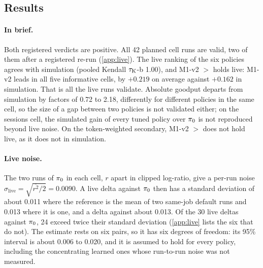 \subsection{Results}
\label{sec:live-results}

\paragraph{In brief.}
Both registered verdicts are positive. All 42 planned cell runs are valid, two of them after a
registered re-run (\cref{app:live}). The live ranking of the six policies agrees with simulation
(pooled Kendall $\tau_{\mathrm{K}}$-b 1.00), and M1-v2 $>$  holds live: M1-v2 leads in all five
informative cells, by $+0.219$ on average against $+0.162$ in simulation. That is all the live runs
validate. Absolute goodput departs from simulation by factors of 0.72 to 2.18, differently for
different policies in the same cell, so the size of a gap between two policies is not validated
either; on the sessions cell, the simulated gain of every tuned policy over $\pi_{0}$ is not
reproduced beyond live noise. On the token-weighted secondary, M1-v2 $>$  does not
hold live, as it does not in simulation.

\paragraph{Live noise.}
The two runs of $\pi_{0}$ in each cell, $r$ apart in clipped log-ratio, give a per-run noise
$\sigma_{\mathrm{live}} = \sqrt{\overline{r^2}/2} = 0.0090$. A live delta against $\pi_{0}$ then has a
standard deviation of about 0.011 where the reference is the mean of two same-job default runs and
0.013 where it is one, and a delta against  about 0.013. Of the 30 live deltas
against $\pi_{0}$, 24 exceed twice their standard deviation (\cref{app:live} lists the six that do
not). The estimate rests on six pairs, so it has six degrees of freedom: its 95\% interval is about
0.006 to 0.020, and it is assumed to hold for every policy, including the concentrating learned
ones whose run-to-run noise was not measured.

